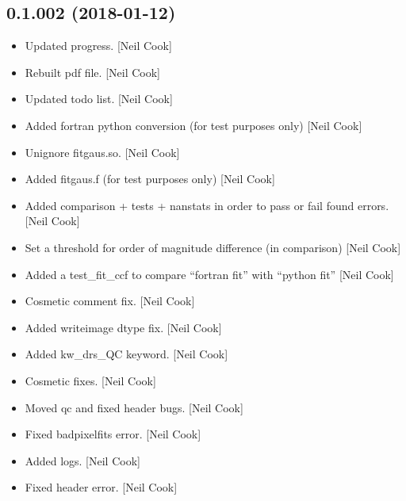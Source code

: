 \documentclass[a4paper,10pt,english]{report}
\begin{document}
\subsection{0.1.002 (2018-01-12)}
\label{\detokenize{misc/changelog:id500}}\begin{itemize}
\item {} 
Updated progress. {[}Neil Cook{]}

\item {} 
Rebuilt pdf file. {[}Neil Cook{]}

\item {} 
Updated todo list. {[}Neil Cook{]}

\item {} 
Added fortran python conversion (for test purposes only) {[}Neil Cook{]}

\item {} 
Unignore fitgaus.so. {[}Neil Cook{]}

\item {} 
Added fitgaus.f (for test purposes only) {[}Neil Cook{]}

\item {} 
Added comparison + tests + nanstats in order to pass or fail found
errors. {[}Neil Cook{]}

\item {} 
Set a threshold for order of magnitude difference (in comparison)
{[}Neil Cook{]}

\item {} 
Added a test\_fit\_ccf to compare “fortran fit” with “python fit” {[}Neil
Cook{]}

\item {} 
Cosmetic comment fix. {[}Neil Cook{]}

\item {} 
Added writeimage dtype fix. {[}Neil Cook{]}

\item {} 
Added kw\_drs\_QC keyword. {[}Neil Cook{]}

\item {} 
Cosmetic fixes. {[}Neil Cook{]}

\item {} 
Moved qc and fixed header bugs. {[}Neil Cook{]}

\item {} 
Fixed badpixelfits error. {[}Neil Cook{]}

\item {} 
Added logs. {[}Neil Cook{]}

\item {} 
Fixed header error. {[}Neil Cook{]}

\end{itemize}
\end{document}
